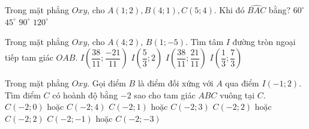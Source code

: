 \begin{ex}%
	Trong mặt phẳng $Oxy$, cho $A(1;2), B(4;1), C(5;4)$. Khi đó $\widehat{BAC}$ bằng?
	\choice
	{$60^{\circ}$}
	{\True $45^{\circ}$}
	{$90^{\circ}$}
	{$120^{\circ}$}
\end{ex}
\begin{ex}%
	Trong mặt phẳng $Oxy$, cho $A\left(4;2\right)$, $B\left(1;-5\right)$. Tìm tâm $I$ đường tròn ngoại tiếp tam giác $OAB$.
	\choice
	{\True $I\left(\dfrac{38}{11}; \dfrac{-21}{11}\right)$}
	{$I\left(\dfrac{5}{3}; 2\right)$}
	{$I\left(\dfrac{38}{11}; \dfrac{21}{11}\right)$}
	{$I\left(\dfrac{1}{3}; \dfrac{7}{3}\right)$}
\end{ex}
\begin{ex}%
	Trong mặt phẳng $Oxy$. Gọi điểm $B$ là điểm đối xứng với $A$ qua điểm $I\left( -1;2\right) $. Tìm điểm $C$ có hoành độ bằng $-2$ sao cho tam giác $ABC$ vuông tại $C$.
	\choice
	{\True $C\left(-2; 0\right)$ hoặc $C\left(-2; 4\right)$ }
	{$C\left(-2; 1\right)$ hoặc $C\left(-2; 3\right)$ }
	{$C\left(-2; 2\right)$ hoặc $C\left(-2; 2\right)$ }
	{$C\left(-2; -1\right)$ hoặc $C\left(-2; -3\right)$ }
\end{ex}
